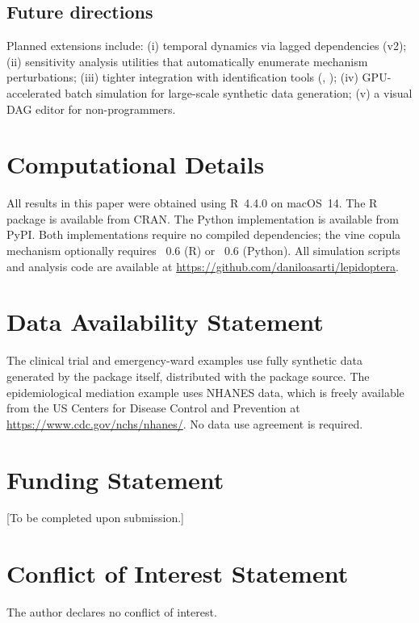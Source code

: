 \documentclass[article]{jss}
\begin{document}
\subsection{Future directions}

Planned extensions include: (i) temporal dynamics via lagged dependencies (v2); (ii) sensitivity analysis utilities that automatically enumerate mechanism perturbations; (iii) tighter integration with identification tools (, ); (iv) GPU-accelerated batch simulation for large-scale synthetic data generation; (v) a visual DAG editor for non-programmers.

\section{Computational Details}
\label{sec:computational}

All results in this paper were obtained using R~4.4.0 \citep{rcore2024} on macOS~14. The  R package is available from CRAN. The Python implementation is available from PyPI. Both implementations require no compiled dependencies; the vine copula mechanism optionally requires ~0.6 \citep{nagler2021rvinecopulib} (R) or ~0.6 (Python). All simulation scripts and analysis code are available at \url{https://github.com/daniloasarti/lepidoptera}.

\section*{Data Availability Statement}
The clinical trial and emergency-ward examples use fully synthetic data generated by the package itself, distributed with the package source. The epidemiological mediation example uses NHANES data, which is freely available from the US Centers for Disease Control and Prevention at \url{https://www.cdc.gov/nchs/nhanes/}. No data use agreement is required.

\section*{Funding Statement}
[To be completed upon submission.]

\section*{Conflict of Interest Statement}
The author declares no conflict of interest.
\end{document}
